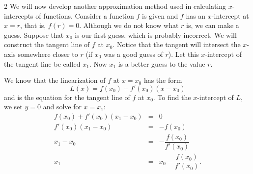 \documentclass{book}
\begin{document}
\begin{multicols}{2}
We will now develop another approximation method used in calculating $x$-intercepts of functions. Consider a function $f$ is given and $f$ has an $x$-intercept at $x=r$, that is, $f(r) = 0$. Although we do not know what $r$ is, we can make a guess. Suppose that $x_0$ is our first guess, which is probably incorrect. We will construct the tangent line of $f$ at $x_0$. Notice that the tangent will intersect the $x$-axis somewhere closer to $r$ (if $x_0$ was a good guess of $r$). Let this $x$-intercept of the tangent line be called $x_1$.  Now $x_1$ is a better guess to the value $r$.  
\begin{center}
\end{center}
\end{multicols}
We know that the linearization of $f$ at $x=x_0$ has the form
 \[L(x) = f(x_0) + f'(x_0)(x-x_0)\] and is the equation for the tangent line of $f$ at $x_0$. To find the $x$-intercept of $L$, we set $y=0$ and solve for $x=x_1$:
 \begin{eqnarray*}
 f(x_0) + f'(x_0)(x_1-x_0) &=&0\\
f'(x_0)(x_1-x_0) &=& - f(x_0)\\
x_1-x_0 &=& -\dfrac{f(x_0)}{f'(x_0)}\\
x_1 &=& x_0 - \dfrac{f(x_0)}{f'(x_0)}.
\end{eqnarray*}
\end{document}
